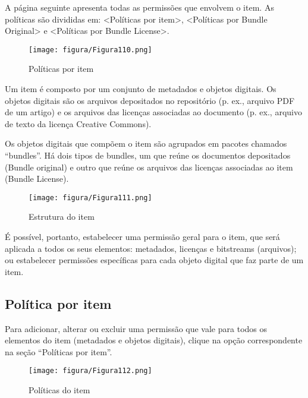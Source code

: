 \documentclass[12pt,hidelinks]{article}
\begin{document}
\newpage

    A página seguinte apresenta todas as permissões que envolvem o item. As políticas são divididas em: <Políticas por item>, <Políticas por Bundle Original> e <Políticas por Bundle License>.
    
    \begin{figure}[!htp]
                \centering
                \texttt{[image: figura/Figura110.png]}
                \caption{Políticas por item}
            \label{Rotulo}
        \end{figure}
        
    Um item é composto por um conjunto de metadados e objetos digitais. Os objetos digitais são os arquivos depositados no repositório (p. ex., arquivo PDF de um artigo) e os arquivos das licenças associadas ao documento (p. ex., arquivo de texto da licença Creative Commons).
    
    \singlespacing
    
    Os objetos digitais que compõem o item são agrupados em pacotes chamados “bundles”. Há dois tipos de bundles, um que reúne os documentos depositados (Bundle original) e outro que reúne os arquivos das licenças associadas ao item (Bundle License).
    
    \begin{figure}[!htp]
                \centering
                \texttt{[image: figura/Figura111.png]}
                \caption{Estrutura do item}
            \label{Rotulo}
        \end{figure}

\newpage
    
    É possível, portanto, estabelecer uma permissão geral para o item, que será aplicada a todos os seus elementos: metadados, licenças e bitstreams (arquivos); ou estabelecer permissões específicas para cada objeto digital que faz parte de um item. 
    
    \subsection{Política por item}
    
    Para adicionar, alterar ou excluir uma permissão que vale para todos os elementos do item (metadados e objetos digitais), clique na opção correspondente na seção “Políticas por item”.
    
    \begin{figure}[!htp]
                \centering
                \texttt{[image: figura/Figura112.png]}
                \caption{Políticas do item}
            \label{Rotulo}
        \end{figure}
    
\end{document}
